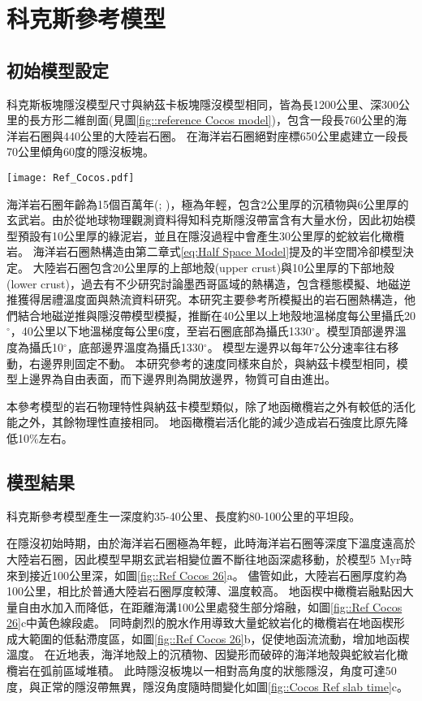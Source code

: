 \newpage
\section{科克斯參考模型}
\subsection{初始模型設定}
科克斯板塊隱沒模型尺寸與納茲卡板塊隱沒模型相同，皆為長1200公里、深300公里的長方形二維剖面(見圖\ref{fig::reference Cocos model})，包含一段長760公里的海洋岩石圈與440公里的大陸岩石圈。
在海洋岩石圈絕對座標650公里處建立一段長70公里傾角60度的隱沒板塊。
\begin{figure*}[ht!]
    \centering
    \texttt{[image: Ref\_Cocos.pdf]}
    \caption[科科斯板塊隱沒模型設計與邊界條件示意圖]{科科斯板塊隱沒模型設計與邊界條件示意圖}
    \label{fig::reference Cocos model}
\end{figure*}

海洋岩石圈年齡為15個百萬年(\citealp{Manea2011Thermal}; \citealp{muller2019})，極為年輕，包含2公里厚的沉積物與6公里厚的玄武岩。由於從地球物理觀測資料得知科克斯隱沒帶富含有大量水份，因此初始模型預設有10公里厚的綠泥岩，並且在隱沒過程中會產生30公里厚的蛇紋岩化橄欖岩。
海洋岩石圈熱構造由第二章式\ref{eq:Half Space Model}提及的半空間冷卻模型決定。
大陸岩石圈包含20公里厚的上部地殼(upper crust)與10公里厚的下部地殼(lower crust)，過去有不少研究討論墨西哥區域的熱構造，包含穩態模擬、地磁逆推獲得居禮溫度面與熱流資料研究。本研究主要參考\citealp{Manea2011Curie}所模擬出的岩石圈熱構造，他們結合地磁逆推與隱沒帶模型模擬，推斷在40公里以上地殼地溫梯度每公里攝氏20$^{\circ}$，40公里以下地溫梯度每公里6度，至岩石圈底部為攝氏1330$^{\circ}$。模型頂部邊界溫度為攝氏10$^{\circ}$，底部邊界溫度為攝氏1330$^{\circ}$。
模型左邊界以每年7公分速率往右移動，右邊界則固定不動。
本研究參考的速度同樣來自於\citealp{o2005uncertainties}，與納茲卡模型相同，模型上邊界為自由表面，而下邊界則為開放邊界，物質可自由進出。

本參考模型的岩石物理特性與納茲卡模型類似，除了地函橄欖岩之外有較低的活化能之外，其餘物理性直接相同。
地函橄欖岩活化能的減少造成岩石強度比原先降低10$\%$左右。


\subsection{模型結果}
科克斯參考模型產生一深度約35-40公里、長度約80-100公里的平坦段。

在隱沒初始時期，由於海洋岩石圈極為年輕，此時海洋岩石圈等深度下溫度遠高於大陸岩石圈，因此模型早期玄武岩相變位置不斷往地函深處移動，於模型5 Myr時來到接近100公里深，如圖\ref{fig::Ref Cocos 26}a。
儘管如此，大陸岩石圈厚度約為100公里，相比於普通大陸岩石圈厚度較薄、溫度較高。
地函楔中橄欖岩融點因大量自由水加入而降低，在距離海溝100公里處發生部分熔融，如圖\ref{fig::Ref Cocos 26}c中黃色線段處。
同時劇烈的脫水作用導致大量蛇紋岩化的橄欖岩在地函楔形成大範圍的低黏滯度區，如圖\ref{fig::Ref Cocos 26}b，促使地函流流動，增加地函楔溫度。
在近地表，海洋地殼上的沉積物、因變形而破碎的海洋地殼與蛇紋岩化橄欖岩在弧前區域堆積。
此時隱沒板塊以一相對高角度的狀態隱沒，角度可達50度，與正常的隱沒帶無異，隱沒角度隨時間變化如圖\ref{fig::Cocos Ref slab time}c。

